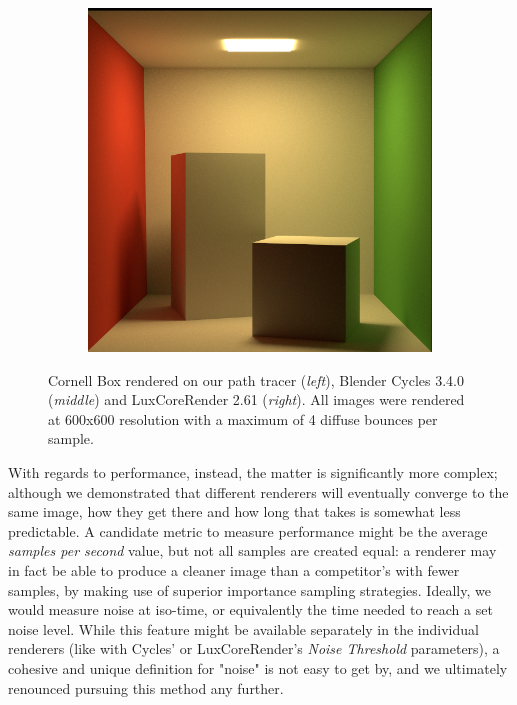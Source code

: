 \documentclass[12pt,a4paper]{article}
\begin{document}
\begin{figure}[h]
\begin{subfigure}{0.3\textwidth}
\end{subfigure}
\hspace{0.2cm}
\begin{subfigure}{0.3\textwidth}
\includegraphics[width=\textwidth]{cornell_box_lux.png}
\end{subfigure}
\caption{Cornell Box rendered on our path tracer (\textit{left}), Blender Cycles 3.4.0 (\textit{middle}) and LuxCoreRender 2.61 (\textit{right}). All images were rendered at 600x600 resolution with a maximum of 4 diffuse bounces per sample.}
\label{img:cornell_box_comparison}
\end{figure}

With regards to performance, instead, the matter is significantly more complex; although we demonstrated that different renderers will eventually converge to the same image, how they get there and how long that takes is somewhat less predictable. A candidate metric to measure performance might be the average \textit{samples per second} value, but not all samples are created equal: a renderer may in fact be able to produce a cleaner image than a competitor's with fewer samples, by making use of superior importance sampling strategies. Ideally, we would measure noise at iso-time, or equivalently the time needed to reach a set noise level. While this feature might be available separately in the individual renderers (like with Cycles'  or LuxCoreRender's \textit{Noise Threshold} parameters), a cohesive and unique definition for "noise" is not easy to get by, and we ultimately renounced pursuing this method any further.
\end{document}
